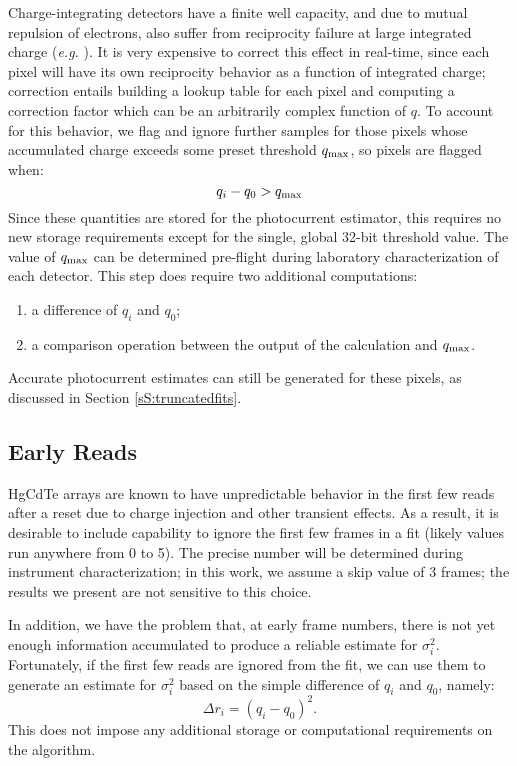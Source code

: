 \documentclass{ws-jai}
\begin{document}
Charge-integrating detectors have a finite well capacity, and due to
mutual repulsion of electrons, also suffer from reciprocity failure at
large integrated charge (\textit{e.g.} \citealt{Biesiadzinski2011}).
It is very expensive to correct this effect in real-time, since each
pixel will have its own reciprocity behavior as a function of
integrated charge; correction entails building a lookup table for each
pixel and computing a correction factor which can be an arbitrarily
complex function of $q$.  To account for this behavior, we flag and
ignore further samples for those pixels whose accumulated charge
exceeds some preset threshold $q_{\rm max}$, so pixels are flagged
when:
%
\begin{equation*}
q_{i} - q_{0} > q_{\rm max}
\end{equation*}
%
Since these quantities are stored for the photocurrent estimator, this
requires no new storage requirements except for the single, global
32-bit threshold value.  The value of $q_{\rm max}$ can be determined
pre-flight during laboratory characterization of each detector.  This
step does require two additional computations:
%
\begin{enumerate}
\item a difference of $q_{i}$ and $q_{0}$;
\item a comparison operation between the output of the calculation and
  $q_{\rm \max}$.
\end{enumerate}
%
Accurate photocurrent estimates can still be generated for these
pixels, as discussed in Section \ref{sS:truncatedfits}.


\subsection{Early Reads}
\label{sS:earlyreads}

HgCdTe arrays are known to have unpredictable behavior in the first few
reads after a reset due to charge injection and other transient
effects.  As a result, it is desirable to include capability to ignore
the first few frames in a fit (likely values run anywhere from 0 to
5).  The precise number will be determined during instrument
characterization; in this work, we assume a skip value of 3 frames;
the results we present are not sensitive to this choice.

In addition, we have the problem that, at early frame numbers, there
is not yet enough information accumulated to produce a reliable
estimate for $\sigma^{2}_{i}$.  Fortunately, if the first few reads
are ignored from the fit, we can use them to generate an estimate for
$\sigma^{2}_{i}$ based on the simple difference of $q_{i}$ and
$q_{0}$, namely:
%
\begin{equation}
\Delta r_{i} = (q_{i} - q_{0})^{2}.
\end{equation}
%
This does not impose any additional storage or computational
requirements on the algorithm. 
\end{document}
